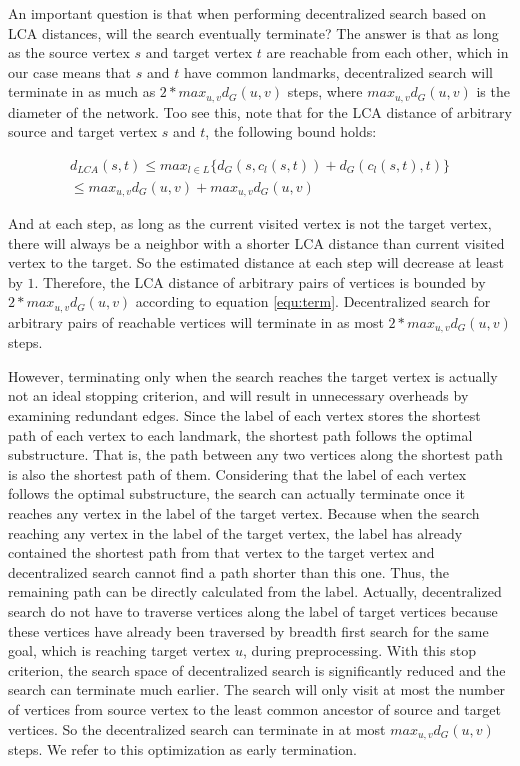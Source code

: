 An important question is that when performing decentralized search based on LCA distances, will the search eventually terminate? The answer is that as long as the source vertex $s$ and target vertex $t$ are reachable from each other, which in our case means that $s$ and $t$ have common landmarks, decentralized search will terminate in as much as $2 * max_{u,v}d_G(u,v)$ steps, where $max_{u,v}d_G(u,v)$ is the diameter of the network. Too see this, note that for the LCA distance of arbitrary source and target vertex $s$ and $t$, the following bound holds:

\begin{equation}
\label{equ:term}
\begin{split}
    d_{LCA}(s,t) \leq max_{l \in L}\{d_G(s,c_l(s,t)) + d_G(c_l(s,t),t)\} \\
		\leq max_{u,v}d_G(u,v) + max_{u,v}d_G(u,v)
\end{split}
\end{equation}

And at each step, as long as the current visited vertex is not the target vertex, there will always be a neighbor with a shorter LCA distance than current visited vertex to the target. So the estimated distance at each step will decrease at least by $1$. Therefore, the LCA distance of arbitrary pairs of vertices is bounded by $2 * max_{u,v}d_G(u,v)$ according to equation \ref{equ:term}. Decentralized search for arbitrary pairs of reachable vertices will terminate in as most $2 * max_{u,v}d_G(u,v)$ steps.

However, terminating only when the search reaches the target vertex is actually not an ideal stopping criterion, and will result in unnecessary overheads by examining redundant edges. Since the label of each vertex stores the shortest path of each vertex to each landmark, the shortest path follows the optimal substructure. That is, the path between any two vertices along the shortest path is also the shortest path of them. Considering that the label of each vertex follows the optimal substructure, the search can actually terminate once it reaches any vertex in the label of the target vertex. Because when the search reaching any vertex in the label of the target vertex, the label has already contained the shortest path from that vertex to the target vertex and decentralized search cannot find a path shorter than this one. Thus, the remaining path can be directly calculated from the label. Actually, decentralized search do not have to traverse vertices along the label of target vertices because these vertices have already been traversed by breadth first search for the same goal, which is reaching target vertex $u$, during preprocessing. With this stop criterion, the search space of decentralized search is significantly reduced and the search can terminate much earlier. The search will only visit at most the number of vertices from source vertex to the least common ancestor of source and target vertices. So the decentralized search can terminate in at most $max_{u,v}d_G(u,v)$ steps. We refer to this optimization as early termination.

